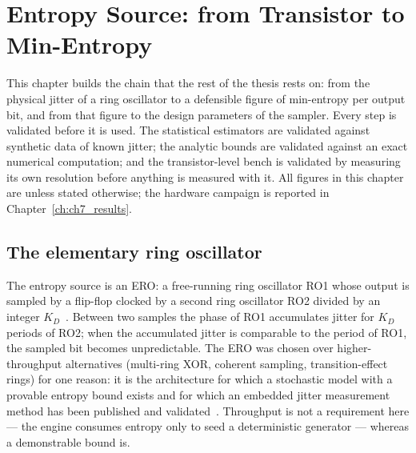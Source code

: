 \chapter{Entropy Source: from Transistor to Min-Entropy}
\label{ch:ch3_entropy}


This chapter builds the chain that the rest of the thesis rests on: from
the physical jitter of a ring oscillator to a defensible figure of
min-entropy per output bit, and from that figure to the design parameters
of the sampler. Every step is validated before it is used. The
statistical estimators are validated against synthetic data of known
jitter; the analytic bounds are validated against an exact numerical
computation; and the transistor-level bench is validated by measuring its
own resolution before anything is measured with it. All figures in this
chapter are \simu{} unless stated otherwise; the hardware campaign is
reported in Chapter~\ref{ch:ch7_results}.

\section{The elementary ring oscillator}
\label{sec:ero}

The entropy source is an \ac{ERO}: a free-running ring oscillator RO1
whose output is sampled by a flip-flop clocked by a second ring
oscillator RO2 divided by an integer $K_D$~\cite{baudet_2011_security,
fischer_2014_embedded}. Between two samples the phase of RO1 accumulates
jitter for $K_D$ periods of RO2; when the accumulated jitter is
comparable to the period of RO1, the sampled bit becomes unpredictable.
The \ac{ERO} was chosen over higher-throughput alternatives (multi-ring
XOR, coherent sampling, transition-effect rings) for one reason: it is
the architecture for which a stochastic model with a provable entropy
bound exists and for which an embedded jitter measurement method has
been published and validated~\cite{fischer_2014_embedded,
petura_2016_survey}. Throughput is
not a requirement here --- the engine consumes entropy only to seed a
deterministic generator --- whereas a demonstrable bound is.

